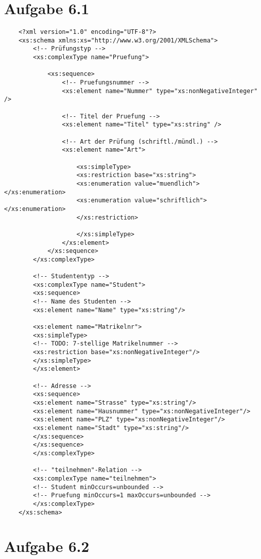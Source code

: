 \documentclass{article}
\begin{document}
	
	
	
	\section*{Aufgabe 6.1}
		\begin{lstlisting}
	<?xml version="1.0" encoding="UTF-8"?>
	<xs:schema xmlns:xs="http://www.w3.org/2001/XMLSchema">
		<!-- Prüfungstyp -->
		<xs:complexType name="Pruefung">
		
			<xs:sequence>
				<!-- Pruefungsnummer -->
				<xs:element name="Nummer" type="xs:nonNegativeInteger" />
				
				<!-- Titel der Pruefung -->
				<xs:element name="Titel" type="xs:string" />
				
				<!-- Art der Prüfung (schriftl./mündl.) -->
				<xs:element name="Art">
				
					<xs:simpleType>
					<xs:restriction base="xs:string">
					<xs:enumeration value="muendlich"></xs:enumeration>
					<xs:enumeration value="schriftlich"></xs:enumeration>
					</xs:restriction>
					
					</xs:simpleType>
				</xs:element>
			</xs:sequence>
		</xs:complexType>
		
		<!-- Studententyp -->
		<xs:complexType name="Student">
		<xs:sequence>
		<!-- Name des Studenten -->
		<xs:element name="Name" type="xs:string"/>
		
		<xs:element name="Matrikelnr">
		<xs:simpleType>
		<!-- TODO: 7-stellige Matrikelnummer -->
		<xs:restriction base="xs:nonNegativeInteger"/>
		</xs:simpleType>
		</xs:element>
		
		<!-- Adresse -->
		<xs:sequence>
		<xs:element name="Strasse" type="xs:string"/>
		<xs:element name="Hausnummer" type="xs:nonNegativeInteger"/>
		<xs:element name="PLZ" type="xs:nonNegativeInteger"/>
		<xs:element name="Stadt" type="xs:string"/>
		</xs:sequence>
		</xs:sequence>
		</xs:complexType>
		
		<!-- "teilnehmen"-Relation -->
		<xs:complexType name="teilnehmen">
		<!-- Student minOccurs=unbounded -->
		<!-- Pruefung minOccurs=1 maxOccurs=unbounded -->
		</xs:complexType>
	</xs:schema>
		\end{lstlisting}
	
	\section*{Aufgabe 6.2}
\end{document}
